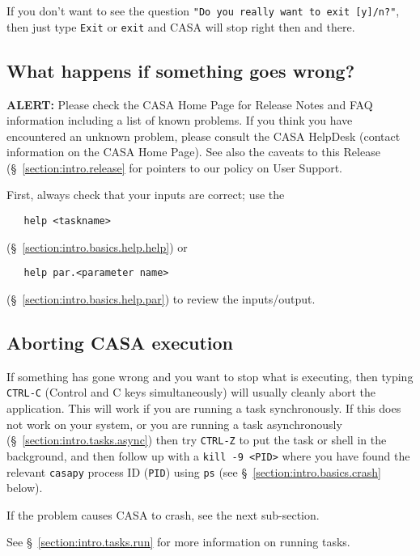 If you don't want to see the question {\tt "Do you really want to exit
[y]/n?"}, then just type {\tt Exit} or {\tt exit} and CASA will stop
right then and there.

\subsection{What happens if something goes wrong?}
\label{section:intro.basics.wrong}

{\bf ALERT:} Please check the CASA Home Page for Release
Notes and FAQ information including a list of known problems.  If you think you
have encountered an unknown problem, please consult the CASA HelpDesk
(contact information on the CASA Home Page).  
See also the caveats to this Release (\S~\ref{section:intro.release} 
for pointers to our policy on User Support.

First, always check that your inputs are correct; use the
\small
\begin{verbatim}
   help <taskname>
\end{verbatim}
\normalsize
(\S~\ref{section:intro.basics.help.help}) or
\small
\begin{verbatim}
   help par.<parameter name>
\end{verbatim}
\normalsize
(\S~\ref{section:intro.basics.help.par}) to review the inputs/output.

\subsection{Aborting CASA execution}
\label{section:intro.basics.wrong.abort}

If something has gone wrong and you want to stop what is executing,
then typing {\tt CTRL-C} (Control and C keys simultaneously) will
usually cleanly abort the application. 
This will work if you are running a task synchronously.
If this does not work on your system, or you are running a task
asynchronously (\S~\ref{section:intro.tasks.async}) 
then try {\tt CTRL-Z} to put the task or shell in the
background, and then follow up with a {\tt kill -9 <PID>} where you
have found the relevant {\tt casapy} process ID ({\tt PID}) using 
{\tt ps} (see \S~\ref{section:intro.basics.crash} below).

If the problem causes CASA to crash, see the next sub-section.

See \S~\ref{section:intro.tasks.run} for more information on running
tasks.

